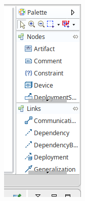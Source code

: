 \documentclass[11pt]{article}
\begin{document}
\begin{center}
\includegraphics[width=.9\linewidth]{images/modelo_2.png}
\end{center}
\end{document}
